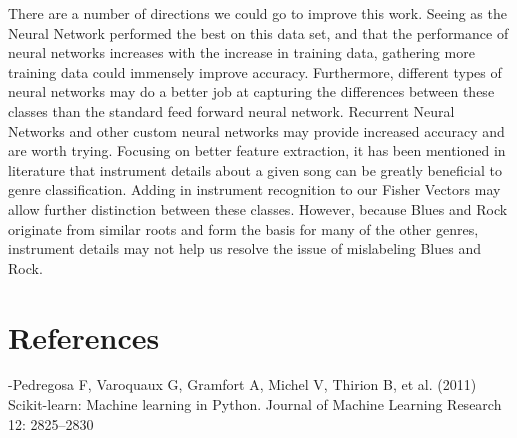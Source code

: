 \documentclass{article}
\begin{document}
\begin{multicols}{2}
There are a number of directions we could go to improve this work. Seeing as the Neural Network performed the best on this data set, and that the performance of neural networks increases with the increase in training data, gathering more training data could immensely improve accuracy. Furthermore, different types of neural networks may do a better job at capturing the differences between these classes than the standard feed forward neural network. Recurrent Neural Networks and other custom neural networks may provide increased accuracy and are worth trying. Focusing on better feature extraction, it has been mentioned in literature that instrument details about a given song can be greatly beneficial to genre classification. Adding in instrument recognition to our Fisher Vectors may allow further distinction between these classes. However, because Blues and Rock originate from similar roots and form the basis for many of the other genres, instrument details may not help us resolve the issue of mislabeling Blues and Rock.

\section{References}
-Pedregosa F, Varoquaux G, Gramfort A, Michel V, Thirion B, et al. (2011) Scikit-learn: Machine
learning in Python. Journal of Machine Learning Research 12: 2825–2830

\end{multicols}
\end{document}
